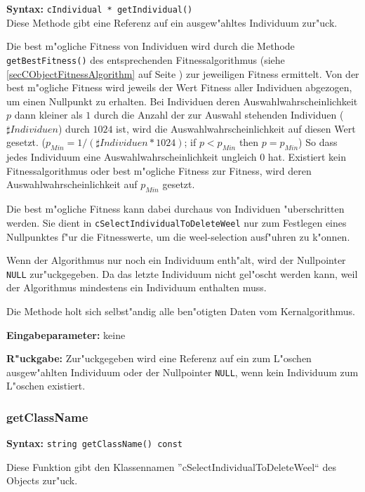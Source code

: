 \textbf{Syntax:} \verb|cIndividual * getIndividual()| \\

Diese Methode gibt eine Referenz auf ein ausgew"ahltes Individuum zur"uck.

Die best m"ogliche Fitness von Individuen wird durch die Methode \verb|getBestFitness()| des entsprechenden Fitnessalgorithmus (siehe \ref{secCObjectFitnessAlgorithm} auf Seite \pageref{secCObjectFitnessAlgorithm}) zur jeweiligen Fitness ermittelt.
Von der best m"ogliche Fitness wird jeweils der Wert Fitness aller Individuen abgezogen, um einen Nullpunkt zu erhalten. Bei Individuen deren Auswahlwahrscheinlichkeit $p$ dann kleiner als $1$ durch die Anzahl der zur Auswahl stehenden Individuen ($\sharp Individuen$) durch $1024$ ist, wird die Auswahlwahrscheinlichkeit auf diesen Wert gesetzt. ($p_{Min}=1/(\sharp Individuen * 1024)$; if $p < p_{Min}$ then $p=p_{Min}$) So dass jedes Individuum eine Auswahlwahrscheinlichkeit ungleich $0$ hat.
Existiert kein Fitnessalgorithmus oder best m"ogliche Fitness zur Fitness, wird deren Auswahlwahrscheinlichkeit auf $p_{Min}$ gesetzt.

Die best m"ogliche Fitness kann dabei durchaus von Individuen "uberschritten werden. Sie dient in \verb|cSelectIndividualToDeleteWeel| nur zum Festlegen eines Nullpunktes f"ur die Fitnesswerte, um die weel-selection ausf"uhren zu k"onnen.

Wenn der Algorithmus nur noch ein Individuum enth"alt, wird der Nullpointer \verb|NULL| zur"uckgegeben. Da das letzte Individuum nicht gel"oscht werden kann, weil der Algorithmus mindestens ein Individuum enthalten muss.

Die Methode holt sich selbst"andig alle ben"otigten Daten vom Kernalgorithmus.

\bigskip\noindent
\textbf{Eingabeparameter:} keine

\bigskip\noindent
\textbf{R"uckgabe:} Zur"uckgegeben wird eine Referenz auf ein zum L"oschen ausgew"ahlten Individuum oder der Nullpointer \verb|NULL|, wenn kein Individuum zum L"oschen existiert.


\subsubsection{getClassName}

\textbf{Syntax:} \verb|string getClassName() const|

\bigskip\noindent
Diese Funktion gibt den Klassennamen ''cSelectIndividualToDeleteWeel`` des Objects zur"uck.

